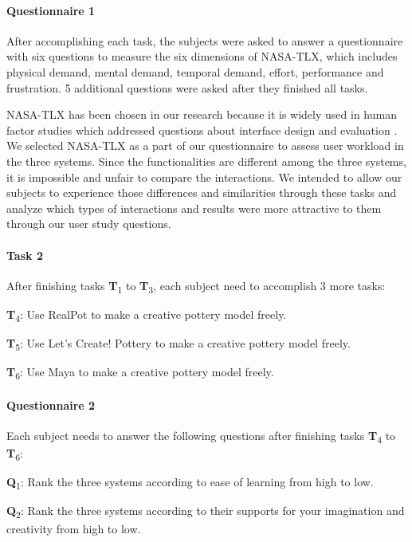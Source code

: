 \documentclass{svjour3}                     %
\begin{document}
\paragraph{Questionnaire 1} After accomplishing each task, the subjects were asked to answer a questionnaire with six questions to measure the six dimensions of NASA-TLX, which includes physical demand, mental demand, temporal demand, effort, performance and frustration. 5 additional questions were asked after they finished all tasks.

NASA-TLX has been chosen in our research because it is widely used in human factor studies which addressed questions about interface design and evaluation \cite{hart2006nasa}.
We selected NASA-TLX as a part of our questionnaire to assess user workload in the three systems.
Since the functionalities are different among the three systems, it is impossible and unfair to compare the interactions.
We intended to allow our subjects to experience those differences and similarities through these tasks and analyze which types of interactions and results were more attractive to them through our user study questions.

\paragraph{Task 2} After finishing tasks \textbf{T}\textsubscript{1} to \textbf{T}\textsubscript{3}, each subject need to accomplish 3 more tasks:

\textbf{T}\textsubscript{4}: Use RealPot to make a creative pottery model freely.

\textbf{T}\textsubscript{5}: Use Let's Create! Pottery to make a creative pottery model freely.

\textbf{T}\textsubscript{6}: Use Maya to make a creative pottery model freely.

\paragraph{Questionnaire 2} Each subject needs to answer the following questions after finishing tasks \textbf{T}\textsubscript{4} to \textbf{T}\textsubscript{6}:

\textbf{Q}\textsubscript{1}: Rank the three systems according to ease of learning from high to low.

\textbf{Q}\textsubscript{2}: Rank the three systems according to their supports for your imagination and creativity from high to low.
\end{document}
